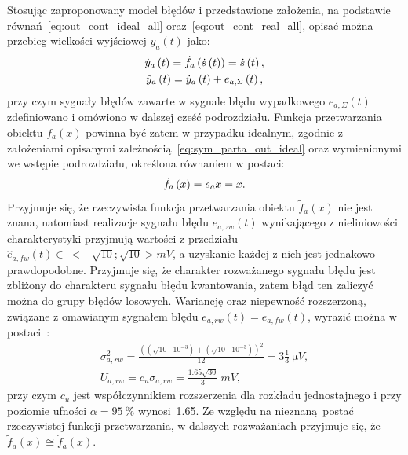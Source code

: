 Stosując zaproponowany model błędów i przedstawione założenia, na podstawie równań~\eqref{eq:out_cont_ideal_all} oraz~\eqref{eq:out_cont_real_all}, opisać można przebieg wielkości wyjściowej $y_{a}(t)$ jako:
\begin{gather}
\dot{y}_{a} \left(t\right) = \dot{f}_{a} \left(\dot{s} \left(t\right)\right) = \dot{s} \left(t\right) \label{eq:sym_parta_out_ideal}, \\
\tilde{y}_{a} \left(t\right) = \dot{y}_{a} \left(t\right) + e_{a,\Sigma} \left(t\right) \label{eq:sym_parta_out_real},
\end{gather}
przy czym sygnały błędów zawarte w sygnale błędu wypadkowego $e_{a,\Sigma}(t)$ zdefiniowano i omówiono w dalszej cześć podrozdziału. Funkcja przetwarzania obiektu $f_{a}(x)$ powinna być zatem w przypadku idealnym, zgodnie z założeniami opisanymi zależnością~\eqref{eq:sym_parta_out_ideal} oraz wymienionymi we wstępie podrozdziału, określona równaniem w postaci:
\begin{equation}
\dot{f}_{a} \left(x\right) = s_{a} x = x \label{eq:sym_parta_statfun}.
\end{equation}
Przyjmuje się, że rzeczywista funkcja przetwarzania obiektu $\tilde{f}_{a}(x)$ nie jest znana, natomiast realizacje sygnału błędu $e_{a,zw}(t)$ wynikającego z nieliniowości charakterystyki przyjmują wartości z przedziału $\hat{e}_{a,fw}(t) \in~<-\sqrt{10};\sqrt{10}>\unit{mV}$, a uzyskanie każdej z nich jest jednakowo prawdopodobne. Przyjmuje się, że charakter rozważanego sygnału błędu jest zbliżony do charakteru sygnału błędu kwantowania, zatem błąd ten zaliczyć można do grupy błędów losowych. Wariancję oraz niepewność rozszerzoną, związane z omawianym sygnałem błędu $e_{a,rw}(t) = e_{a,fw}(t)$, wyrazić można w postaci~\cite{jcgm_guide}:
\begin{gather}
\sigma_{a,rw}^{2} = \frac{\left( \left( \sqrt{10} \cdot 10^{-3} \right) + \left( \sqrt{10} \cdot 10^{-3} \right) \right)^{2}}{12} = 3 \frac{1}{3}~\unit{\micro V} \label{eq:sym_parta_rand_self_var}, \\
U_{a,rw} = c_{u} \sigma_{a,rw} = \frac{\num{1.65} \sqrt{30}}{3}~\unit{mV} \label{eq:sym_parta_rand_self_unc},
\end{gather}
przy czym $c_{u}$ jest współczynnikiem rozszerzenia dla rozkładu jednostajnego i przy poziomie ufności $\alpha = \qty{95}{\percent}$ wynosi~\num{1.65}. Ze względu na nieznaną postać rzeczywistej funkcji przetwarzania, w dalszych rozważaniach przyjmuje się, że $\tilde{f}_{a}(x)  \cong  \dot{f}_{a}(x)$.

